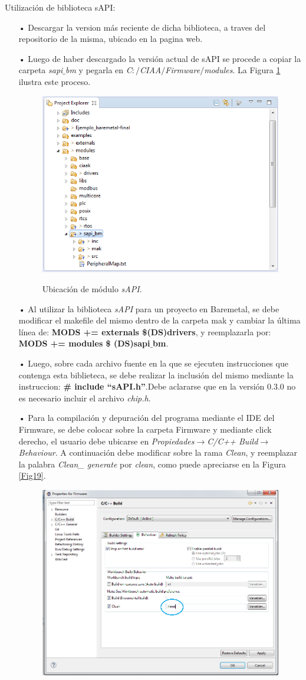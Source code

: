 \documentclass[12pt,letterpaper]{article}
\begin{document}
Utilización de biblioteca sAPI:
\begin{enumerate}
\item[•]Descargar la version más reciente de dicha biblioteca, a traves del repositorio de la misma, ubicado en la pagina web.
\item[•]Luego de haber descargado la versión actual de  sAPI se procede a copiar la carpeta \textit{sapi$\_$bm} y pegarla en \textit{C$:/$CIAA$/$Firmware$/$modules}. La Figura \ref{sapiuso} ilustra este proceso.
\begin{figure}[H]
\centering
\includegraphics[width=8 cm]{figuras/sapiuso.png}\\
\caption{Ubicación de módulo \textit{sAPI}.}
\label{sapiuso}
\end{figure} 
\item[•]Al utilizar la biblioteca \textit{sAPI} para un proyecto en Baremetal, se debe modificar el makefile del mismo dentro de la carpeta mak y cambiar la última línea de: \textbf{MODS += externals \$(DS)drivers}, y reemplazarla por:  \textbf{MODS += modules \$ (DS)sapi$\_$bm}.
\item[•]Luego, sobre cada archivo fuente en la que se ejecuten instrucciones que contenga esta biblieteca, se debe realizar la inclusión del mismo mediante la instruccion: \textbf{\# include “sAPI.h”}.Debe aclararse que en la versión 0.3.0 no es necesario incluir el archivo \textit{chip.h}.
\item[•]Para la compilación y depuración del programa mediante el IDE del Firmware, se debe colocar sobre la carpeta Firmware y mediante click derecho, el usuario debe ubicarse en \textit{Propiedades}$\rightarrow$\textit{C/C++ Build}$\rightarrow$\textit{Behaviour}. A continuación debe modificar sobre la rama \textit{Clean}, y reemplazar la palabra \textit{Clean\_ generate} por  \textit{clean}, como puede apreciarse en la Figura \ref{Fig19}.
\begin{figure}[H]
\centering
\includegraphics[width=8 cm]{figuras/f1.png}\\

\end{figure}
\end{enumerate}
\end{document}
